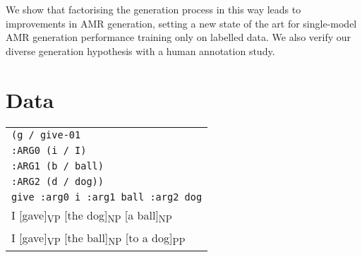 We show that factorising the generation process in this way leads to improvements in AMR generation, setting a new state of the art for single-model AMR generation performance training only on labelled data. We also verify our diverse generation hypothesis with a human annotation study.



\section{Data}
\label{sec:data}
\begin{table}
\centering
\begin{tabular}{|l|}
\toprule 
\texttt{(g / give-01} \\
\hspace{1em} \texttt{:ARG0 (i / I)} \\
\hspace{1em} \texttt{:ARG1 (b / ball)} \\
\hspace{1em} \texttt{:ARG2 (d / dog))} \\
\midrule
\texttt{\small give :arg0 i :arg1 ball :arg2 dog} \\
\midrule
I [gave]\textsubscript{VP} [the dog]\textsubscript{NP} [a ball]\textsubscript{NP} \\
I [gave]\textsubscript{VP} [the ball]\textsubscript{NP} [to a dog]\textsubscript{PP} \\
\bottomrule
\end{tabular}
\label{fig:amr}
\vspace{-1em}

\end{table}

